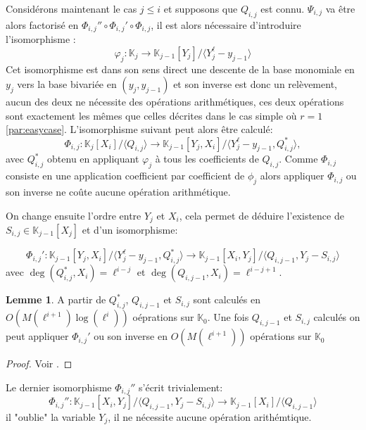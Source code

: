 \documentclass[10pt,a4paper]{book}
\theoremstyle{plain}
\theoremstyle{definition}
\newtheorem{lem}[thm]{Lemme}
\theoremstyle{definition}
\theoremstyle{definition}
\theoremstyle{definition}
\theoremstyle{remark}
\theoremstyle{remark}
\theoremstyle{definition}
\begin{document}
Considérons maintenant le cas $j \leqslant i$ et supposons que $Q_{i,j}$ est connu. $\Psi_{i,j}$ va être alors factorisé en $\Phi_{i,j}'' \circ \Phi_{i,j}' \circ \Phi_{i,j}$, il est alors nécessaire d'introduire l'isomorphisme :
\begin{equation*}
\varphi_j:\mathbb{K}_j \to \mathbb{K}_{j-1}[Y_j]/\langle Y_j^{\ell}-y_{j-1} \rangle
\end{equation*}
Cet isomorphisme est dans son sens direct une descente de la base monomiale en $y_j$ vers la base bivariée en $(y_j,y_{j-1})$ et son inverse est donc un relèvement, aucun des deux ne nécessite des opérations arithmétiques, ces deux opérations sont exactement les mêmes que celles décrites dans le cas simple où $r=1$ \ref{par:easycase}. L'isomorphisme suivant peut alors être calculé:
\begin{equation*}
\Phi_{i,j}: \mathbb{K}_j[X_i]/\langle Q_{i,j} \rangle \to \mathbb{K}_{j-1}[Y_j,X_i]/\langle Y_j^{\ell}-y_{j-1},Q_{i,j}^* \rangle , 
\end{equation*} 
avec $Q_{i,j}^*$ obtenu en appliquant $\varphi_j$ à tous les coefficients de $Q_{i,j}$. Comme $\Phi_{i,j}$ consiste en une application coefficient par coefficient de $\phi_j$ alors appliquer $\Phi_{i,j}$ ou son inverse ne coûte aucune opération arithmétique.

On change ensuite l'ordre entre $Y_j$ et $X_i$, cela permet de déduire l'existence de $S_{i,j} \in \mathbb{K}_{j-1}[X_j]$ et d'un isomorphisme:

\begin{equation*}
\Phi_{i,j}': \mathbb{K}_{j-1}[Y_j,X_i]/ \langle Y_j^{\ell}-y_{j-1},Q_{i,j}^* \rangle \to \mathbb{K}_{j-1}[X_i,Y_j]/\langle Q_{i,j-1}, Y_j-S_{i,j}\rangle
\end{equation*}
avec $\deg(Q_{i,j}^*,X_i)=\ell^{i-j}$ et $\deg(Q_{i,j-1},X_i)=\ell^{i-j+1}$.

\begin{lem}
A partir de $Q_{i,j}^*$, $Q_{i,j-1}$ et $S_{i,j}$ sont calculés en $O(M(\ell^{i+1})\log(\ell^i))$ oéprations sur $\mathbb{K}_0$. Une fois  $Q_{i,j-1}$ et $S_{i,j}$ calculés on peut appliquer $\Phi_{i,j}'$ ou son inverse en $O(M(\ell^{i+1}))$ opérations sur $\mathbb{K}_0$
\end{lem}

\begin{proof}
Voir \cite{DeFeo-Doliskani-Schost13}.
\end{proof}

Le dernier isomorphisme $\Phi_{i,j}''$ s'écrit trivialement:
\begin{equation*}
\Phi_{i,j}'': \mathbb{K}_{j-1}[X_i,Y_j]/\langle Q_{i,j-1}, Y_j-S_{i,j}\rangle \to \mathbb{K}_{j-1}[X_i]/\langle Q_{i,j-1} \rangle 
\end{equation*}
il "oublie" la variable $Y_j$, il ne nécessite aucune opération arithémtique.
\end{document}
